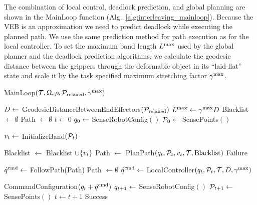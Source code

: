 The combination of local control, deadlock prediction, and global planning are shown in the MainLoop function (Alg.~\ref{alg:interleaving_mainloop}). Because the VEB is an approximation we need to predict deadlock while executing the planned path. We use the same prediction method for path execution as for the local controller. To set the maximum band length $L^\textrm{max}$ used by the global planner and the deadlock prediction algorithms, we calculate the geodesic distance between the grippers through the deformable object in its ``laid-flat'' state and scale it by the task specified maximum stretching factor $\gamma^{\textrm{max}}$.


\begin{algorithm}[h]
\caption{MainLoop$(\mathcal{T}, \Omega, \rho, \mathcal{P}_\textrm{relaxed}, \gamma^{\textrm{max}})$}
\begin{algorithmic}[1]
    \State $D \gets$ GeodesicDistanceBetweenEndEffectors$(\mathcal{P}_\textrm{relaxed})$
    \State $L^\textrm{max} \gets \gamma^{\textrm{max}} D$
    \State Blacklist $\gets \emptyset$
    \State Path $\gets \emptyset$
    \State $t \gets 0$
    \State $q_0 \gets$ SenseRobotConfig$()$
    \State $\mathcal{P}_0 \gets$ SensePoints$()$
    
        \State $v_t \gets$ InitializeBand$(\mathcal{P}_t)$
        
            \State Blacklist $\gets$ Blacklist $\cup \{ v_t \}$
            \State Path $\gets$ PlanPath$(q_t, \mathcal{P}_t, v_t, \mathcal{T}, \textrm{Blacklist})$
                \State \Return Failure
            \EndIf
        \EndIf
        
            \State $\dot{q}^{\textrm{cmd}} \gets$ FollowPath(Path)
                \State Path $\gets \emptyset$
            \EndIf
        \Else
            \State $\dot{q}^{\textrm{cmd}} \gets$ LocalController$(q_t, \mathcal{P}_t, \mathcal{T}, D, \gamma^{\textrm{max}})$
        \EndIf
        
        \State CommandConfiguration$(q_t + \dot{q}^{\textrm{cmd}})$
        \State $q_{t+1} \gets$ SenseRobotConfig$()$
        \State $\mathcal{P}_{t+1} \gets$ SensePoints$()$
        \State $t \gets t + 1$
    \EndWhile
    \State \Return Success
\end{algorithmic}
\label{alg:interleaving_mainloop}
\end{algorithm}
